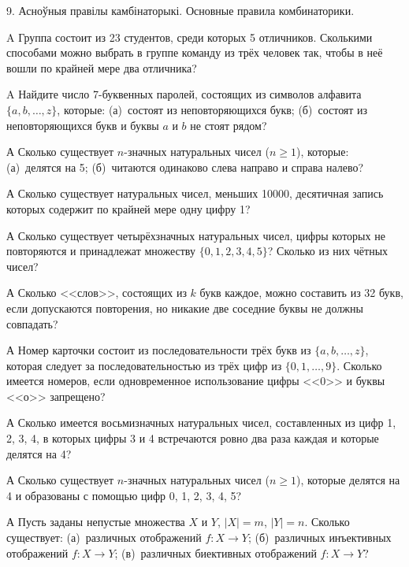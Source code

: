 



\biLangHeader
{9. Асноўныя правілы камбінаторыкі.}
{Основные правила комбинаторики.}

\begin{problemList}
	
\problemItemSimple
{A}
{Группа состоит из 23 студентов, среди которых 5 отличников. Сколькими способами можно выбрать в группе команду из трёх человек так, чтобы в неё вошли по крайней мере два отличника?}	

\problemItemSimple
{A}
{Найдите число 7-буквенных паролей, состоящих из символов алфавита $\{a, b, \dots, z \}$, которые: (а)~состоят из неповторяющихся букв; (б)~состоят из неповторяющихся букв и буквы $a$ и $b$ не стоят рядом?}

\problemItemSimple
{А}
{Сколько существует $n$-значных натуральных чисел ($n \ge 1$), которые: (а)~делятся на 5; (б)~читаются одинаково слева направо и справа налево?}

\problemItemSimple
{А}
{Сколько существует натуральных чисел, меньших 10000, десятичная запись которых содержит по крайней мере одну цифру 1?}

\problemItemSimple
{А}
{Сколько существует четырёхзначных натуральных чисел, цифры которых не повторяются и принадлежат множеству $\{0, 1, 2, 3, 4, 5\}$? Сколько из них чётных чисел?}

\problemItemSimple
{А}
{Сколько <<слов>>, состоящих из $k$ букв каждое, можно составить из 32 букв, если допускаются повторения, но никакие две соседние буквы не должны совпадать?}

\problemItemSimple
{А}
{Номер карточки состоит из последовательности трёх букв из $\{a, b, \dots, z \}$, которая следует за последовательностью из трёх цифр из $\{0, 1, \dots, 9 \}$. Сколько имеется номеров, если одновременное использование цифры <<0>> и буквы <<о>> запрещено?}

\problemItemSimple
{А}
{Сколько имеется восьмизначных натуральных чисел, составленных из цифр 1, 2, 3, 4, в которых цифры 3 и 4 встречаются ровно два раза каждая и которые делятся на 4?}

\problemItemSimple
{А}
{Сколько существует $n$-значных натуральных чисел ($n \ge 1$), которые делятся на 4 и образованы с помощью цифр 0, 1, 2, 3, 4, 5?} 

\problemItemSimple
{А}
{Пусть заданы непустые множества $X$ и $Y$, $|X|=m$, $|Y|=n$. Сколько существует: (а)~различных отображений $f : X \rightarrow Y$; (б)~различных инъективных отображений $f : X \rightarrow Y$; (в)~различных биективных отображений $f : X \rightarrow Y$?}


\end{problemList}
